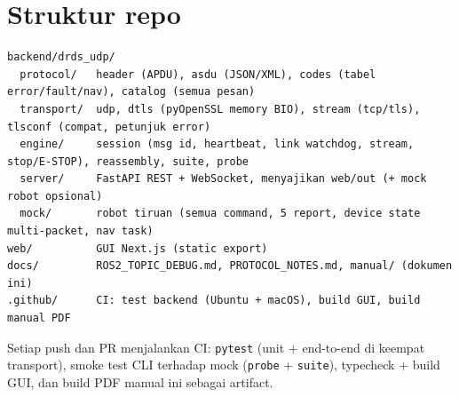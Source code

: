 \documentclass[11pt,a4paper]{article}
\newcommand{\code}[1]{\texttt{#1}}
\begin{document}
\section{Struktur repo}\label{app:repo}
\begin{lstlisting}
backend/drds_udp/
  protocol/   header (APDU), asdu (JSON/XML), codes (tabel error/fault/nav), catalog (semua pesan)
  transport/  udp, dtls (pyOpenSSL memory BIO), stream (tcp/tls), tlsconf (compat, petunjuk error)
  engine/     session (msg id, heartbeat, link watchdog, stream, stop/E-STOP), reassembly, suite, probe
  server/     FastAPI REST + WebSocket, menyajikan web/out (+ mock robot opsional)
  mock/       robot tiruan (semua command, 5 report, device state multi-packet, nav task)
web/          GUI Next.js (static export)
docs/         ROS2_TOPIC_DEBUG.md, PROTOCOL_NOTES.md, manual/ (dokumen ini)
.github/      CI: test backend (Ubuntu + macOS), build GUI, build manual PDF
\end{lstlisting}
Setiap push dan PR menjalankan CI: \code{pytest} (unit + end-to-end di keempat transport), smoke test CLI terhadap
mock (\code{probe} + \code{suite}), typecheck + build GUI, dan build PDF manual ini sebagai artifact.
\end{document}

